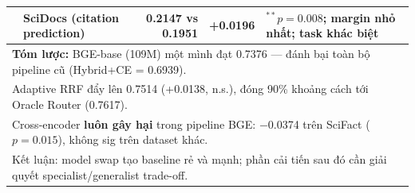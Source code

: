 \begin{table}[htbp]
{\begin{tabular}{llrrl}
& SciDocs (citation prediction)     & 0.2147 vs 0.1951 & +0.0196  & ${}^{**}p=0.008$; margin nhỏ nhất; task khác biệt \\
\midrule
\multicolumn{5}{l}{\footnotesize \textbf{Tóm lược:} BGE-base (109M) một mình đạt 0.7376 — đánh bại toàn bộ pipeline cũ (Hybrid+CE = 0.6939).} \\
\multicolumn{5}{l}{\footnotesize Adaptive RRF đẩy lên 0.7514 (+0.0138, n.s.), đóng 90\% khoảng cách tới Oracle Router (0.7617).} \\
\multicolumn{5}{l}{\footnotesize Cross-encoder \textbf{luôn gây hại} trong pipeline BGE: $-$0.0374 trên SciFact ($p=0.015$), không sig trên dataset khác.} \\
\multicolumn{5}{l}{\footnotesize Kết luận: model swap tạo baseline rẻ và mạnh; phần cải tiến sau đó cần giải quyết specialist/generalist trade-off.} \\
\bottomrule
\end{tabular}
}
\end{table}
